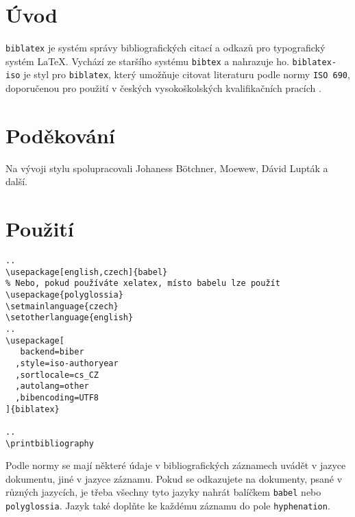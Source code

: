 \documentclass[a4paper,10pt]{ltxdockit}
\def\t|#1|{\texttt{#1}}
\begin{document}
\printtitlepage
\tableofcontents
\section{Úvod}
\t|biblatex| je systém správy bibliografických citací a odkazů pro typografický
systém \LaTeX. Vychází ze staršího systému \t|bibtex| a nahrazuje ho.
\t|biblatex-iso| je styl pro \t|biblatex|, který umožňuje citovat literaturu
podle normy \t|ISO 690|, doporučenou pro použití v českých vysokoškolských
kvalifikačních pracích \parencite{t00}.

\section{Poděkování}

Na vývoji stylu spolupracovali Johaness Bötchner, Moewew, Dávid Lupták a další.

\section{Použití}
\begin{verbatim}
..
\usepackage[english,czech]{babel}
% Nebo, pokud používáte xelatex, místo babelu lze použít 
\usepackage{polyglossia}
\setmainlanguage{czech}
\setotherlanguage{english}
..
\usepackage[
   backend=biber
  ,style=iso-authoryear
  ,sortlocale=cs_CZ
  ,autolang=other
  ,bibencoding=UTF8
]{biblatex}

..
\printbibliography

\end{verbatim}

Podle normy se mají některé údaje v bibliografických záznamech uvádět v jazyce dokumentu, jiné v jazyce záznamu. Pokud se odkazujete na dokumenty, psané v různých jazycích, je třeba všechny tyto jazyky nahrát balíčkem \t|babel| nebo \t|polyglossia|. Jazyk také doplňte ke každému záznamu do pole \t|hyphenation|.

\end{document}
